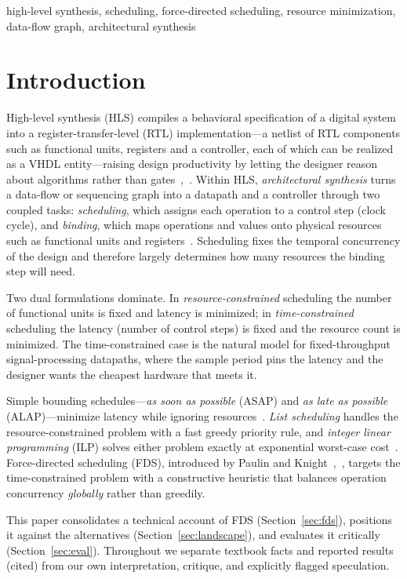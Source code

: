 \documentclass[conference]{IEEEtran}
\begin{document}
\begin{IEEEkeywords}
high-level synthesis, scheduling, force-directed scheduling, resource minimization, data-flow graph, architectural synthesis
\end{IEEEkeywords}

\section{Introduction}
High-level synthesis (HLS) compiles a behavioral specification of a digital
system into a register-transfer-level (RTL) implementation---a netlist of RTL
components such as functional units, registers and a controller, each of which
can be realized as a VHDL entity---raising design productivity by letting the
designer reason about algorithms rather than gates~\cite{b2},~\cite{b3}. Within
HLS, \emph{architectural synthesis} turns a data-flow or sequencing graph into a
datapath and a controller through two coupled tasks: \emph{scheduling}, which
assigns each operation to a control step (clock cycle), and \emph{binding},
which maps operations and values onto physical resources such as functional
units and registers~\cite{b2}. Scheduling fixes the temporal concurrency of the
design and therefore largely determines how many resources the binding step
will need.

Two dual formulations dominate. In \emph{resource-constrained} scheduling the
number of functional units is fixed and latency is minimized; in
\emph{time-constrained} scheduling the latency (number of control steps) is
fixed and the resource count is minimized. The time-constrained case is the
natural model for fixed-throughput signal-processing datapaths, where the
sample period pins the latency and the designer wants the cheapest hardware
that meets it.

Simple bounding schedules---\emph{as soon as possible} (ASAP) and \emph{as late
as possible} (ALAP)---minimize latency while ignoring resources~\cite{b2}.
\emph{List scheduling} handles the resource-constrained problem with a fast
greedy priority rule, and \emph{integer linear programming} (ILP) solves either
problem exactly at exponential worst-case cost~\cite{b2}. Force-directed
scheduling (FDS), introduced by Paulin and Knight~\cite{b1},~\cite{b4}, targets
the time-constrained problem with a constructive heuristic that balances
operation concurrency \emph{globally} rather than greedily.

This paper consolidates a technical account of FDS (Section~\ref{sec:fds}),
positions it against the alternatives (Section~\ref{sec:landscape}), and
evaluates it critically (Section~\ref{sec:eval}). Throughout we separate
textbook facts and reported results (cited) from our own interpretation,
critique, and explicitly flagged speculation.
\end{document}
